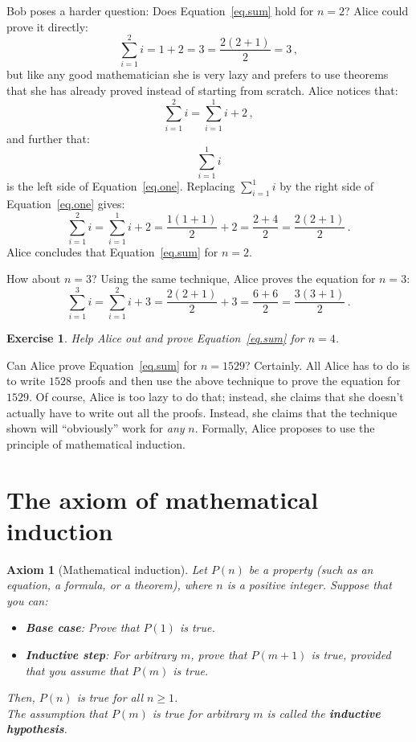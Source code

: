 \documentclass[11pt,a4paper]{report}
\newtheorem{axiom}{Axiom}
\newtheorem{exercise}{Exercise}
\begin{document}
Bob poses a harder question: Does Equation~\ref{eq.sum} hold for $n=2$? Alice could prove it directly:
\[
\sum_{i=1}^2 i = 1 + 2 = 3 = \frac{2(2+1)}{2}=3\,,
\]
but like any good mathematician she is very lazy and prefers to use theorems that she has already proved instead of starting from scratch. Alice notices that:
\[
\sum_{i=1}^2 i = \sum_{i=1}^1 i + 2\,,
\]
and further that:
\[
\sum_{i=1}^1 i
\]
is the left side of Equation~\ref{eq.one}. Replacing $\sum_{i=1}^1 i$ by the right side of Equation~\ref{eq.one} gives:
\[
\sum_{i=1}^2 i = \sum_{i=1}^1 i +2 = \frac{1(1+1)}{2} + 2 = \frac{2 + 4}{2} = \frac{2(2+1)}{2}\,.
\]
Alice concludes that Equation~\ref{eq.sum} for $n=2$.

How about $n=3$? Using the same technique, Alice proves the equation for $n=3$:
\[
\sum_{i=1}^3 i = \sum_{i=1}^2 i + 3 = \frac{2(2+1)}{2} + 3 = \frac{6+6}{2} = \frac{3(3+1)}{2}\,.
\]

\begin{exercise}
Help Alice out and prove Equation~\ref{eq.sum} for $n=4$.
\end{exercise}

Can Alice prove Equation~\ref{eq.sum} for $n=1529$? Certainly. All Alice has to do is to write $1528$ proofs and then use the above technique to prove the equation for $1529$. Of course, Alice is too lazy to do that; instead, she claims that she doesn't actually have to write out all the proofs. Instead, she claims that the technique shown will ``obviously'' work for \emph{any} $n$. Formally, Alice proposes to use the principle of mathematical induction.

\newpage

\section{The axiom of mathematical induction}

\begin{axiom}[Mathematical induction]\label{ax.induction} Let $P(n)$ be a property (such as an equation, a formula, or a theorem), where $n$ is a positive integer. Suppose that you can:
\begin{itemize}
\item \textbf{Base case}: Prove that $P(1)$ is true.
\item \textbf{Inductive step}: For arbitrary $m$, prove that $P(m+1)$ is true, provided that you assume that $P(m)$ is true.
\end{itemize}
Then, $P(n)$ is true for all $n\geq 1$.\\
The assumption that $P(m)$ is true for arbitrary $m$ is called the \textbf{inductive hypothesis}.
\end{axiom}
\end{document}
